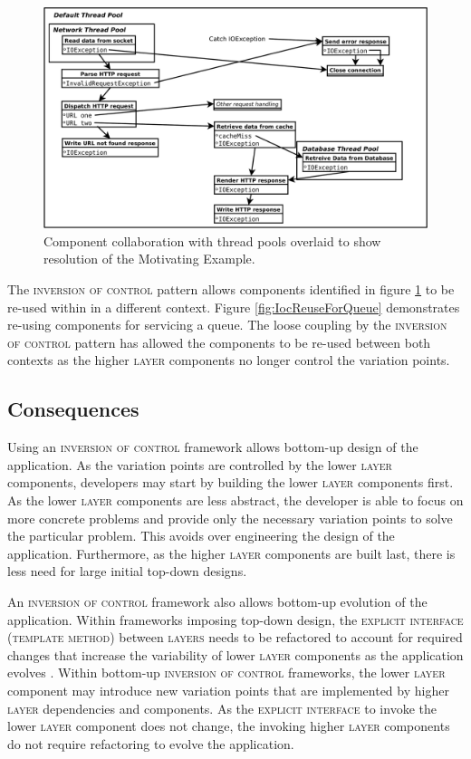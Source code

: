 \documentclass[prodmode]{style/acmlarge}
\begin{document}
\begin{figure}[t]
\centering
\includegraphics[width=4.5in]{IocMotivatingExampleResolved}
\caption{Component collaboration with thread pools overlaid to show resolution of the Motivating Example.}
\label{fig:IocMotivatingExampleResolved}
\end{figure}

The \textsc{inversion of control} pattern allows components identified in figure
\ref{fig:IocMotivatingExampleResolved} to be re-used within in a different
context. Figure \ref{fig:IocReuseForQueue} demonstrates re-using components for
servicing a queue.  The loose coupling by the \textsc{inversion of control}
pattern has allowed the components to be re-used between both contexts as the
higher \textsc{layer} components no longer control the variation points.


\subsection{Consequences}

Using an \textsc{inversion of control} framework allows bottom-up design of the
application.  As the variation points are controlled by the lower \textsc{layer}
components, developers may start by building the lower \textsc{layer} components
first.  As the lower \textsc{layer} components are less abstract, the developer
is able to focus on more concrete problems and provide only the necessary
variation points to solve the particular problem.  This avoids over engineering
the design of the application.  Furthermore, as the higher \textsc{layer}
components are built last, there is less need for large initial top-down
designs.

An \textsc{inversion of control} framework also allows bottom-up evolution of
the application.  Within frameworks imposing top-down design, the
\textsc{explicit interface} (\textsc{template method}) between \textsc{layers}
needs to be refactored to account for required changes that increase the
variability of lower \textsc{layer} components as the application evolves
\cite{ioc}.  Within bottom-up \textsc{inversion of control} frameworks, the
lower \textsc{layer} component may introduce new variation points that are
implemented by higher \textsc{layer} dependencies and components.  As the
\textsc{explicit interface} to invoke the lower \textsc{layer} component does
not change, the invoking higher \textsc{layer} components do not require
refactoring to evolve the application.
\end{document}
